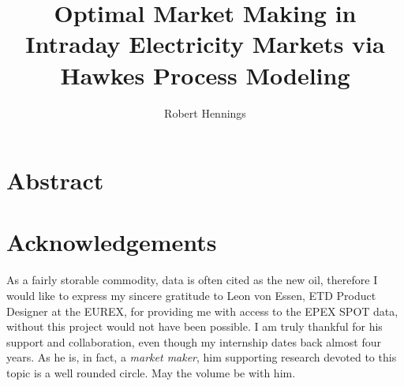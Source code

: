 \documentclass[12pt,a4paper]{cau_thesis}
\title{Optimal Market Making in Intraday Electricity Markets via Hawkes Process Modeling}
\author{Robert Hennings}
\institute{Institute for Quantitative Business and Economic Research}
\begin{document}

% 
% 

% 
\hypersetup{pageanchor=true}
\pagestyle{plain}
\chapter*{Abstract} %

\pagestyle{plain}
\chapter*{Acknowledgements} %
As a fairly storable commodity, data is often cited as the new oil,
therefore I would like to express my sincere gratitude to Leon von
Essen, ETD Product Designer at the EUREX, for providing me with access to
the EPEX SPOT data, without this project would not have been possible.
I am truly thankful for his support and collaboration, even though my
internship dates back almost four years. As he is, in fact, a \textit{market maker},
him supporting research devoted to this topic is a well rounded circle.
May the volume be with him.

\clearpage
% 
\hypersetup{linktoc=all}
\tableofcontents
\markboth{~}{} %
\end{document}
